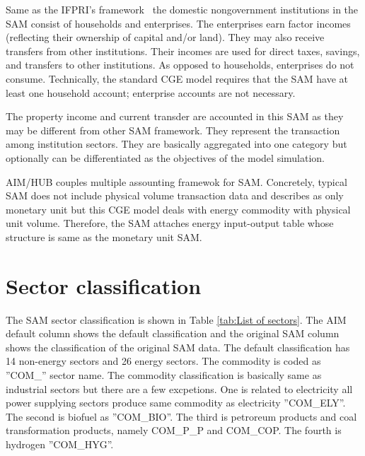 \documentclass[10pt,a4paper,titlepage,dvipdfmx]{book}
\begin{document}
Same as the IFPRI's framework~\cite{RN2739} the domestic nongovernment institutions in the SAM consist of households and enterprises. The enterprises earn factor incomes (reflecting their ownership of capital and/or land). They may also receive transfers from other institutions. Their incomes are used for direct taxes, savings, and transfers to other institutions. As opposed to households, enterprises do not consume. Technically, the standard CGE model requires that the SAM have at least one household account; enterprise accounts are not necessary. 

The property income and current transder are accounted in this SAM as they may be different from other SAM framework. They represent the transaction among institution sectors. They are basically aggregated into one category but optionally can be differentiated as the objectives of the model simulation.

AIM/HUB couples multiple assounting framewok for SAM. Concretely, typical SAM does not include physical volume transaction data and describes as only monetary unit but this CGE model deals with energy commodity with physical unit volume. Therefore, the SAM attaches energy input-output table whose structure is same as the monetary unit SAM.

\section{\label{sec:SecClas}Sector classification}

The SAM sector classification is shown in Table \ref{tab:List of sectors}. The AIM default column shows the default classification and the original SAM column shows the classification of the original SAM data. The default classification has 14 non-energy sectors and 26 energy sectors. The commodity is coded as ''COM\_'' sector name. The commodity classification is basically same as industrial sectors but there are a few excpetions. One is related to electricity all power supplying sectors produce same commodity as electricity ''COM\_ELY''. The second is biofuel as ''COM\_BIO''. The third is petroreum products and coal transformation products, namely COM\_P\_P and COM\_COP. The fourth is hydrogen ''COM\_HYG''.
\end{document}
